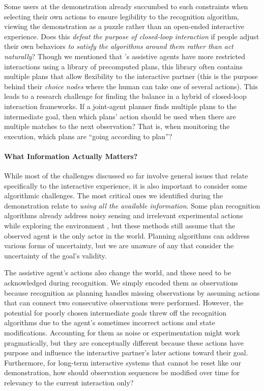 \documentclass[letterpaper]{article} %
\begin{document}
Some users at the demonstration already succumbed to such constraints when selecting their own actions to ensure legibility to the recognition algorithm, viewing the demonstration as a puzzle rather than an open-ended interactive experience.  Does this \textit{defeat the purpose of closed-loop interaction} if people adjust their own behaviors \textit{to satisfy the algorithms around them rather than act naturally}?  Though we mentioned that \citeauthor{jair_levineWilliams}'s  assistive agents have more restricted interactions using %
 a library of precomputed plans, this library often contains multiple plans that allow flexibility to the interactive partner (this is the purpose behind their \textit{choice nodes} where the human can take one of several actions).  This leads to a research challenge for finding the balance in a hybrid of closed-loop interaction frameworks.  If a joint-agent planner finds multiple plans to the intermediate goal, then which plans' action should be used when there are multiple matches to the next observation?  That is, when monitoring the execution, which plans are ``going according to plan''?




\paragraph{What Information Actually Matters?} While most of the challenges discussed so far involve general issues that relate specifically to the interactive experience, it is also important to consider some algorithmic challenges. %
 The most critical ones we identified during the demonstration relate to \textit{using all the available information}.  Some plan recognition algorithms already address noisy sensing \cite{DBLP:conf/ijcai/SohrabiRU16} and irrelevant experimental actions while exploring the environment \cite{DBLP:journals/tist/MirskyGS17}, but these methods still assume that the observed agent is the only actor in the world.  Planning algorithms can address various forms of uncertainty, but we are unaware of any that consider the uncertainty of the goal's validity.

The assistive agent's actions also change the world, and these need to be acknowledged during recognition.  We simply encoded them as observations because recognition as planning handles missing observations by assuming actions %
 that can connect two consecutive observations %
 were performed.  However, the potential for poorly chosen intermediate goals %
 threw off the recognition algorithms due to the agent's sometimes incorrect actions and state modifications.  Accounting for them as noise or experimentation might work pragmatically, but they are conceptually different because these actions have purpose and influence the interactive partner's later actions toward their goal.  Furthermore, for long-term interactive systems that cannot be reset like our demonstration, how should observation sequences be modified over time for relevancy to the current interaction only?
\end{document}
